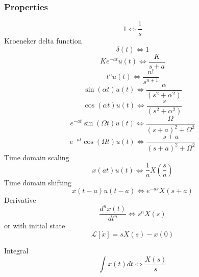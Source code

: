 \documentclass{article}
\begin{document}
		\subsubsection{Properties}
			\begin{equation}
				1 \Leftrightarrow \frac{1}{{s}}
			\end{equation}
			Kroeneker delta function
			\begin{equation}
				\delta (t) \Leftrightarrow 1
			\end{equation}
			\begin{equation}
				Ke^{ - at} u(t) \Leftrightarrow \frac{K}{{s + a}}			
			\end{equation}
			\begin{equation}
				t^n u(t) \Leftrightarrow \frac{{n!}}{{s^{n + 1} }}
			\end{equation}
			\begin{equation}
				\sin (\alpha t)u(t) \Leftrightarrow \frac{\alpha }{{(s^2 + \alpha ^2 )}}
			\end{equation}
			\begin{equation}
				\cos (\alpha t)u(t) \Leftrightarrow \frac{s}{{(s^2 + \alpha ^2 )}}
			\end{equation}
			\begin{equation}
			e^{ - at} \sin (\Omega t)u(t) \Leftrightarrow \frac{\Omega }{{(s + a)^2 + \Omega ^2 }}
			\end{equation}
			\begin{equation}
				e^{ - at} \cos (\Omega t)u(t) \Leftrightarrow \frac{{s + a}}{{(s + a)^2 + \Omega ^2 }}
			\end{equation}
			Time domain scaling
			\begin{equation}
				x(at)u(t) \Leftrightarrow \frac{1}{a}X\left( {\frac{s}{a}} \right)
			\end{equation}
			Time domain shifting 
			\begin{equation}
				x(t - a)u(t - a) \Leftrightarrow e^{ - as} X(s + a)
			\end{equation}
			Derivative
			\begin{equation}
				\frac{{d^n x(t)}}{{dt^n }} \Leftrightarrow s^n X(s)			
			\end{equation}
			or with initial state
			\begin{equation}
				\mathcal{L}[\dot{x}] = sX(s)-x(0)
			\end{equation}

			Integral			
			\begin{equation}
				\int{x(t)dt} \Leftrightarrow \frac{X(s)}{s}
			\end{equation}			
			
\end{document}
